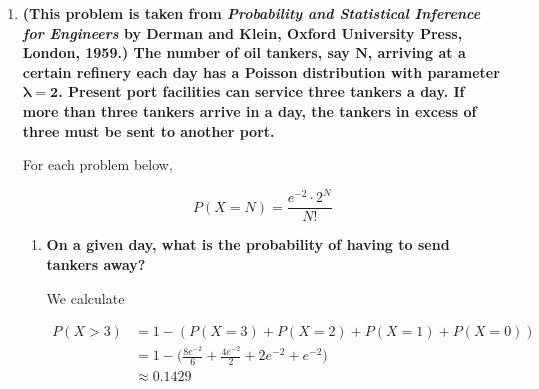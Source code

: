 \documentclass[10pt, oneside]{article}
\begin{document}
\begin{enumerate}[label=8.\arabic*]
In words, what the aforementioned ratio tells us is that as long as $k$ is less than $\lambda$, the successive probability will continue to be greater than the last, i.e. $P(X = k -1) < P(X = k)$. Now, if $\lambda$ is an integer, there will come a point where $\lambda = k$. At this point, $P(X = k -1) = P(X = k)$. Afterwards, when $k$ now ascends to be greater than $\lambda$, each successive probability is now \textit{less} than the preceding one, or $P(X = k) < P(X = k - 1)$. It is apparent that our point of interest at the point where $\boxed{X = \lambda = k}$, where we hit our peak -- or peaks, rather -- at $P(X = k)$ and $P(X = k - 1)$. In the case where $\lambda$ is not an integer, then the Poisson distribution is maximized at $X = \floor{\lambda}$.

This is consistent with the result of the maxima of the binomial distribution, which is expected since the Poisson distribution is the limiting case of the binomial for high $n$ and low $p$.

\item  \begin{tcolorbox}[
  colback=Cerulean!5!white,
  colframe=Cerulean!75!black]
\textbf{(This problem is taken from \textit{Probability and Statistical Inference for Engineers} by Derman and Klein, Oxford University Press, London, 1959.) The number of oil tankers, say $\bm{N}$, arriving at a certain refinery each day has a Poisson distribution with parameter $\bm{\lambda = 2}$. Present port facilities can service three tankers a day. If more than three tankers arrive in a day, the tankers in excess of three must be sent to another port.}
\end{tcolorbox}

For each problem below,

\[ P(X = N) = \frac{e^{-2} \cdot 2^N}{N!} \]

	\begin{enumerate}
	\item  \begin{tcolorbox}[
	  colback=Cerulean!5!white,
	  colframe=Cerulean!75!black]
	\textbf{On a given day, what is the probability of having to send tankers away?}
	\end{tcolorbox}
	
	We calculate
	
	\begin{align*}
	P(X > 3) &= 1 - (P(X = 3) + P(X = 2) + P(X = 1) + P(X = 0)) \\
	&= 1 - \Big( \frac{8e^{-2}}{6} + \frac{4 e^{-2}}{2} + 2e^{-2} + e^{-2} \Big) \\
	&\approx \boxed{0.1429}
	\end{align*}
	

\end{enumerate}
\end{enumerate}
\end{document}
